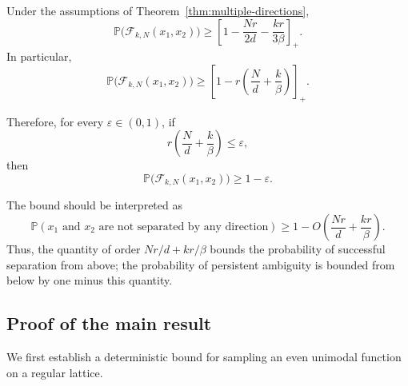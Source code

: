 \begin{corollary}
\label{cor:elementary-small-distance-bound}

Under the assumptions of
Theorem~\ref{thm:multiple-directions},
\begin{equation}
    \mathbb{P}\bigl(\mathcal{F}_{k,N}(x_1,x_2)\bigr)
    \geq
    \left[
        1-
        \frac{Nr}{2d}
        -
        \frac{kr}{3\beta}
    \right]_+.
    \label{eq:elementary-lower-bound}
\end{equation}
In particular,
\begin{equation}
    \boxed{
    \mathbb{P}\bigl(\mathcal{F}_{k,N}(x_1,x_2)\bigr)
    \geq
    \left[
        1-
        r\left(
            \frac{N}{d}
            +
            \frac{k}{\beta}
        \right)
    \right]_+.
    }
    \label{eq:simple-lower-bound}
\end{equation}

Therefore, for every $\varepsilon\in(0,1)$, if
\begin{equation}
    r
    \left(
        \frac{N}{d}
        +
        \frac{k}{\beta}
    \right)
    \leq
    \varepsilon,
    \label{eq:small-distance-condition}
\end{equation}
then
\begin{equation}
    \boxed{
    \mathbb{P}\bigl(\mathcal{F}_{k,N}(x_1,x_2)\bigr)
    \geq
    1-\varepsilon.
    }
    \label{eq:small-distance-conclusion}
\end{equation}
\end{corollary}

The bound should be interpreted as
\begin{equation}
    \mathbb{P}
    \left(
        \text{$x_1$ and $x_2$ are not separated by any direction}
    \right)
    \geq
    1-
    O\left(
        \frac{Nr}{d}
        +
        \frac{kr}{\beta}
    \right).
    \label{eq:informal-main-bound}
\end{equation}
Thus, the quantity of order
$Nr/d+kr/\beta$ bounds the probability of successful separation from
above; the probability of persistent ambiguity is bounded from below
by one minus this quantity.


\subsection{Proof of the main result}
\label{app:multiple-ctp-directions:proof}

We first establish a deterministic bound for sampling an even
unimodal function on a regular lattice.

